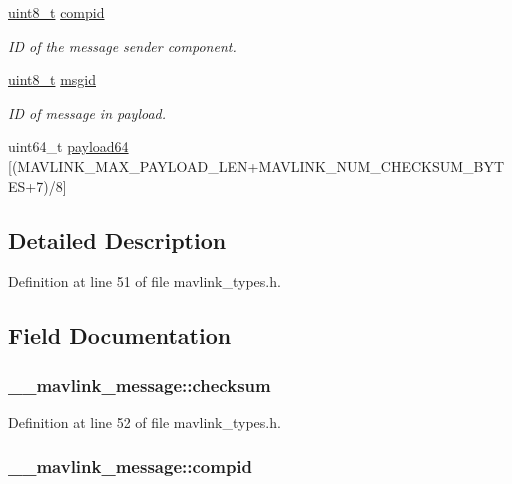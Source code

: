 \begin{DoxyCompactItemize}
\hyperlink{stdint_8h_aba7bc1797add20fe3efdf37ced1182c5}{uint8\-\_\-t} \hyperlink{struct____mavlink__message_a83ed773c359ffe4a8d0746f82af2b44d}{compid}
\begin{DoxyCompactList}\small\item\em I\-D of the message sender component. \end{DoxyCompactList}\item 
\hyperlink{stdint_8h_aba7bc1797add20fe3efdf37ced1182c5}{uint8\-\_\-t} \hyperlink{struct____mavlink__message_a8d95b61c61b9086bada158104828d593}{msgid}
\begin{DoxyCompactList}\small\item\em I\-D of message in payload. \end{DoxyCompactList}\item 
uint64\-\_\-t \hyperlink{struct____mavlink__message_a267401209e74271b7ded879bb0f44e73}{payload64} \mbox{[}(M\-A\-V\-L\-I\-N\-K\-\_\-\-M\-A\-X\-\_\-\-P\-A\-Y\-L\-O\-A\-D\-\_\-\-L\-E\-N+M\-A\-V\-L\-I\-N\-K\-\_\-\-N\-U\-M\-\_\-\-C\-H\-E\-C\-K\-S\-U\-M\-\_\-\-B\-Y\-T\-E\-S+7)/8\mbox{]}
\end{DoxyCompactItemize}


\subsection{Detailed Description}


Definition at line 51 of file mavlink\-\_\-types.\-h.



\subsection{Field Documentation}
\hypertarget{struct____mavlink__message_a8c200d7751471b5ac54d090ba279a5a6}{
\subsubsection[{checksum}]{ \-\_\-\-\_\-mavlink\-\_\-message\-::checksum}}\label{struct____mavlink__message_a8c200d7751471b5ac54d090ba279a5a6}


Definition at line 52 of file mavlink\-\_\-types.\-h.

\hypertarget{struct____mavlink__message_a83ed773c359ffe4a8d0746f82af2b44d}{
\subsubsection[{compid}]{ \-\_\-\-\_\-mavlink\-\_\-message\-::compid}}\label{struct____mavlink__message_a83ed773c359ffe4a8d0746f82af2b44d}


